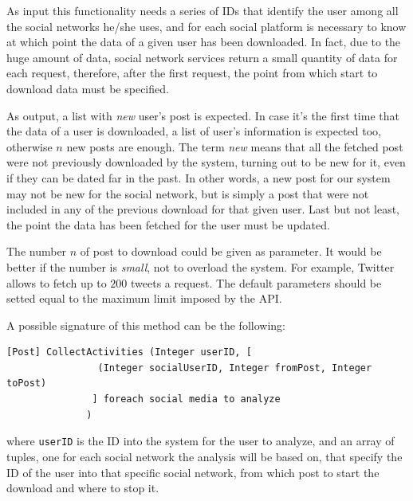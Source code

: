As input this functionality needs a series of IDs that identify the user among all the social networks he/she uses, and for each social platform is necessary to know at which point the data of a given user has been downloaded. In fact, due to the huge amount of data, social network services return a small quantity of data for each request, therefore, after the first request, the point from which start to download data must be specified.

As output, a list with \textit{new} user's post is expected. In case it's the first time that the data of a user is downloaded, a list of user's information is expected too, otherwise $ n $ new posts are enough. The term \textit{new} means that all the fetched post were not previously downloaded by the system, turning out to be new for it, even if they can be dated far in the past. In other words, a new post for our system may not be new for the social network, but is simply a post that were not included in any of the previous download for that given user. Last but not least, the point the data has been fetched for the user must be updated.

The number $ n $ of post to download could be given as parameter. It would be better if the number is \textit{small}, not to overload the system. For example, Twitter allows to fetch up to $ 200 $ tweets a request. The default parameters should be setted equal to the maximum limit imposed by the API.

A possible signature of this method can be the following:

\begin{Verbatim}
[Post] CollectActivities (Integer userID, [
			    (Integer socialUserID, Integer fromPost, Integer toPost)
			   ] foreach social media to analyze
			  )
\end{Verbatim}
where \texttt{userID} is the ID into the system for the user to analyze, and an array of tuples, one for each social network the analysis will be based on, that specify the ID of the user into that specific social network, from which post to start the download and where to stop it.

